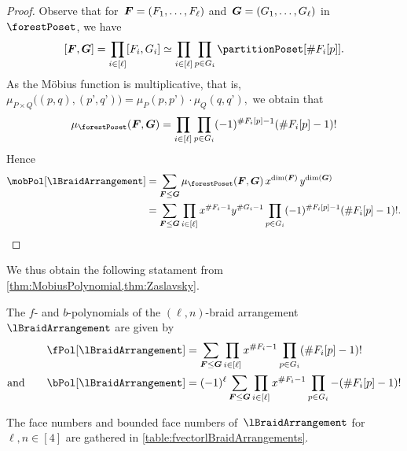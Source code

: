 \begin{proof}
Observe that for~$\boldsymbol{F} = (F_1, \dots, F_\ell)$ and~$\boldsymbol{G} = (G_1, \dots, G_\ell)$ in~$\forestPoset$, we have
\[
[\b{F}, \b{G}] = \prod_{i \in [\ell]} [F_i, G_i] \simeq \prod_{i \in [\ell]} \prod_{p \in G_i} \partitionPoset[{\#F_i[p]}].
\]
As the M\"obius function is multiplicative, that is,
\(
\mu_{P \times Q} \big( (p,q), (p’,q’) \big) = \mu_P(p,p’) \cdot \mu_Q(q,q’),
\)
we obtain that
\[
\mu_{\forestPoset}(\b{F}, \b{G}) = \prod_{i \in [\ell]} \prod_{p \in G_i} (-1)^{\#F_i[p]-1} (\# F_i[p]-1)!
\]
Hence
\begin{align*}
\mobPol[\lBraidArrangement] 
& = \sum_{\b{F} \le \b{G}} \mu_{\forestPoset}(\b{F}, \b{G}) \, x^{\dim(\b{F})} \, y^{\dim(\b{G})} \\
& = \sum_{\b{F} \le \b{G}} \prod_{i \in [\ell]} x^{\#F_i-1} y^{\#G_i-1} \prod_{p \in G_i} (-1)^{\#F_i[p]-1} (\# F_i[p]-1)!.
\qedhere
\end{align*}
\end{proof}

We thus obtain the following statament from \cref{thm:MobiusPolynomial,thm:Zaslavsky}.

\begin{corollary}
\label{coro:fbvectorslBraidArrangement}
The $f$- and $b$-polynomials of the $(\ell,n)$-braid arrangement~$\lBraidArrangement$ are given by
\begin{align*}
\fPol[\lBraidArrangement] & = \sum_{\b{F} \le \b{G}} \prod_{i \in [\ell]} x^{\#F_i-1} \prod_{p \in G_i} (\# F_i[p]-1)!\\
\text{and}\qquad
\bPol[\lBraidArrangement] & = (-1)^\ell \sum_{\b{F} \le \b{G}} \prod_{i \in [\ell]} x^{\#F_i-1} \prod_{p \in G_i} -(\# F_i[p]-1)!
\end{align*}
\end{corollary}

The face numbers and bounded face numbers of~$\lBraidArrangement$ for~$\ell, n \in [4]$ are gathered in \cref{table:fvectorlBraidArrangements}.

